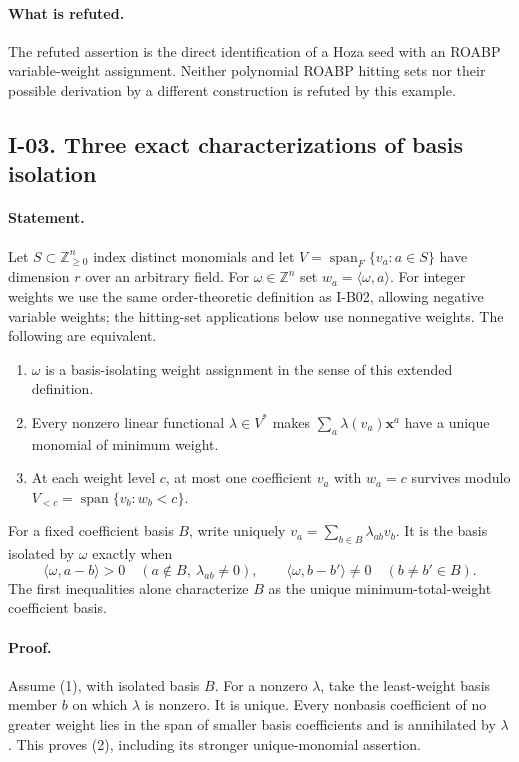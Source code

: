 \documentclass[11pt,a4paper]{article}
\theoremstyle{definition}\newtheorem{definition}{Definition}
\begin{document}
\paragraph{What is refuted.}
The refuted assertion is the direct identification of a Hoza seed with
an ROABP variable-weight assignment.  Neither polynomial ROABP hitting
sets nor their possible derivation by a different construction is
refuted by this example.

\subsection{I-03. Three exact characterizations of basis isolation}
\label{I-03}

\paragraph{Statement.}
Let $S\subset\mathbb Z_{\geq0}^n$ index distinct monomials and let
$V=\operatorname{span}_F\{v_a:a\in S\}$ have dimension $r$ over an arbitrary field.
For $\omega\in\mathbb Z^n$ set $w_a=\langle\omega,a\rangle$.
For integer weights we use the same order-theoretic definition as
I-B02, allowing negative variable weights; the hitting-set
applications below use nonnegative weights.
The following are equivalent.
\begin{enumerate}
\item $\omega$ is a basis-isolating weight assignment in the sense of
this extended definition.
\item Every nonzero linear functional $\lambda\in V^*$ makes
$\sum_a\lambda(v_a)\mathbf x^a$ have a unique monomial of minimum weight.
\item At each weight level $c$, at most one coefficient $v_a$ with
$w_a=c$ survives modulo
$V_{<c}=\operatorname{span}\{v_b:w_b<c\}$.
\end{enumerate}
For a fixed coefficient basis $B$, write uniquely
$v_a=\sum_{b\in B}\lambda_{ab}v_b$.  It is the basis isolated by
$\omega$ exactly when
\[
 \langle\omega,a-b\rangle>0
 \quad(a\notin B,\ \lambda_{ab}\ne0),
 \qquad
 \langle\omega,b-b'\rangle\ne0\quad(b\ne b'\in B).
\tag{I.3}\label{eq:I-cone}
\]
The first inequalities alone characterize $B$ as the unique
minimum-total-weight coefficient basis.

\paragraph{Proof.}
Assume (1), with isolated basis $B$.  For a nonzero $\lambda$, take
the least-weight basis member $b$ on which $\lambda$ is nonzero.
It is unique.  Every nonbasis coefficient of no greater weight lies
in the span of smaller basis coefficients and is annihilated by
$\lambda$.  This proves (2), including its stronger unique-monomial
assertion.
\end{document}
